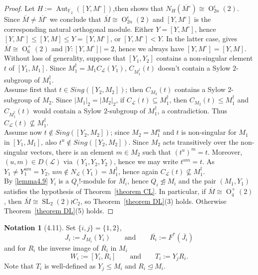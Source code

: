 \documentclass{amsart}
\numberwithin{equation}{section}
\theoremstyle{definition}
\newtheorem{notation}[equation]{Notation}
\theoremstyle{subresult}
\theoremstyle{caseresult}
\renewcommand{\L}{\mathcal{L}}
\newcommand{\Aut}{\operatorname{Aut}}
\newcommand{\SL}{\operatorname{SL}}
\renewcommand{\O}{\operatorname{O}}
\newcommand{\ov}{\overline}
\newcommand{\norm}{\trianglelefteq}
\newcommand{\<}{\langle}
\renewcommand{\>}{\rangle}
\begin{document}
\begin{proof}
	Let $H := \Aut_{\mathbb{F}_2}([Y,M^\circ])$,then \cite[Lemma B.35(d)]{Meier-Stell-Stroth:2012} shows that $N_H(\ov{M^\circ}) \cong \O_{2n}^\epsilon(2)$. Since $\ov{M} \ne \ov{M^\circ}$ we conclude that $\ov{M} \cong \O_{2n}^\epsilon(2)$ and $[Y,M^\circ]$ is the corresponding natural orthogonal module. Either $Y = [Y,M^\circ]$, hence $[Y,M^\circ] \le [Y,M] \le Y = [Y,M^\circ]$, or $ [Y,M^\circ] < Y$. In the latter case, \cite[Theorem C.22]{Meier-Stell-Stroth:2012} gives $\ov{M} \cong \O_6^+(2)$ and $|Y:[Y,M^\circ]|=2$, hence we always have $[Y,M^\circ]=[Y,M]$.\\
	
	Without loss of generality, suppose that $[Y_1,Y_2]$ contains a non-singular element $t$ of $[Y_1,M_1]$. Since $M_1^\dagger = M_1 C_{\L}(Y_1)$, $C_{M_1^\dagger}(t)$ doesn't contain a Sylow $2$-subgroup of $M_1^\dagger$.\\
	Assume first that $t \in Sing([Y_2,M_2])$; then $C_{M_2}(t)$ contains a Sylow $2$-subgroup of $M_2$. Since $|M_1|_2 = |M_2|_2$, if $C_\L(t) \subseteq M_1^\dagger$, then $C_{M_2}(t) \le M_1^\dagger$ and $C_{M_1^\dagger}(t)$ would contain a Sylow $2$-subgroup of $M_1^\dagger$, a contradiction. Thus $C_\L(t) \not \subseteq M_1^\dagger$.\\
	Assume now $t \not \in Sing([Y_2,M_2])$; since $M_2=M_1^u$ and $t$ is non-singular for $M_1$ in $[Y_1,M_1]$, also $t^u \not \in Sing([Y_2,M_2])$. Since $M_2$ acts transitively over the non-singular vectors, there is an element $m \in M_2$ such that $(t^u)^m =t$. Moreover, $(u,m) \in D(\L)$ via $(Y_1,Y_2,Y_2)$, hence we may write $t^{um} = t$. As $Y_1 \ne Y_1^{um} = Y_2$, $um \not \in N_\L(Y_1) = M_1^\dagger$, hence again $C_\L(t) \not \subseteq M_1^\dagger$.\\
	By \ref{lemma4.9} $Y_i$ is a $Q_i!$-module for $\ov{M_i}$, hence $Q_i \not \norm M_i$ and the pair $(M_1,Y_1)$ satisfies the hypothesis of Theorem~\ref{theorem CL}. In particular, if $\ov{M} \cong \O_4^+(2)$, then $\ov{M} \cong \SL_2(2) \wr C_2$, so Theorem~\ref{theorem DL}(3) holds. Otherwise Theorem~\ref{theorem DL}(5) holds.
\end{proof}

\begin{notation}[4.11]
	Set $\{i,j\} = \{1,2\}$,
	\[
	J_i := J_{M_i}(Y_i) \qquad \text{and} \qquad \ov{R_i} := F^*(\ov{J_i})
	\]
	and for $R_i$ the inverse image of $\ov{R_i}$ in $M_i$
	\[
	W_i :=[Y_i,R_i] \qquad \text{and} \qquad T_i:=Y_jR_i.
	\]
	Note that $T_i$ is well-defined as $Y_j \le M_i$ and $R_i \norm M_i$.
\end{notation}
\end{document}
